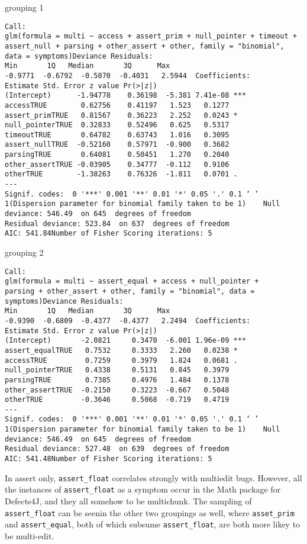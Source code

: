 grouping 1
\begin{lstlisting}
Call:
glm(formula = multi ~ access + assert_prim + null_pointer + timeout +
assert_null + parsing + other_assert + other, family = "binomial",
data = symptoms)Deviance Residuals:
Min       1Q   Median       3Q      Max
-0.9771  -0.6792  -0.5070  -0.4031   2.5944  Coefficients:
Estimate Std. Error z value Pr(>|z|)
(Intercept)      -1.94778    0.36198  -5.381 7.41e-08 ***
accessTRUE        0.62756    0.41197   1.523   0.1277
assert_primTRUE   0.81567    0.36223   2.252   0.0243 *
null_pointerTRUE  0.32833    0.52496   0.625   0.5317
timeoutTRUE       0.64782    0.63743   1.016   0.3095
assert_nullTRUE  -0.52160    0.57971  -0.900   0.3682
parsingTRUE       0.64081    0.50451   1.270   0.2040
other_assertTRUE -0.03905    0.34777  -0.112   0.9106
otherTRUE        -1.38263    0.76326  -1.811   0.0701 .
---
Signif. codes:  0 '***' 0.001 '**' 0.01 '*' 0.05 '.' 0.1 ‘ ’ 1(Dispersion parameter for binomial family taken to be 1)    Null deviance: 546.49  on 645  degrees of freedom
Residual deviance: 523.84  on 637  degrees of freedom
AIC: 541.84Number of Fisher Scoring iterations: 5
\end{lstlisting}

grouping 2
\begin{lstlisting}
Call:
glm(formula = multi ~ assert_equal + access + null_pointer +
parsing + other_assert + other, family = "binomial", data = symptoms)Deviance Residuals:
Min       1Q   Median       3Q      Max
-0.9390  -0.6809  -0.4377  -0.4377   2.2494  Coefficients:
Estimate Std. Error z value Pr(>|z|)
(Intercept)       -2.0821     0.3470  -6.001 1.96e-09 ***
assert_equalTRUE   0.7532     0.3333   2.260   0.0238 *
accessTRUE         0.7259     0.3979   1.824   0.0681 .
null_pointerTRUE   0.4338     0.5131   0.845   0.3979
parsingTRUE        0.7385     0.4976   1.484   0.1378
other_assertTRUE  -0.2150     0.3223  -0.667   0.5048
otherTRUE         -0.3646     0.5068  -0.719   0.4719
---
Signif. codes:  0 '***' 0.001 '**' 0.01 '*' 0.05 '.' 0.1 ‘ ’ 1(Dispersion parameter for binomial family taken to be 1)    Null deviance: 546.49  on 645  degrees of freedom
Residual deviance: 527.48  on 639  degrees of freedom
AIC: 541.48Number of Fisher Scoring iterations: 5
\end{lstlisting}

In assert only, \lstinline{assert_float} correlates strongly with multiedit bugs. However, all the instances of \lstinline{assert_float} as a symptom occur in the Math package for Defects4J, and they all somehow to be multichunk. The sampling of \lstinline{assert_float} can be seenin the other two groupings as well, where \lstinline{asset_prim} and \lstinline{assert_equal}, both of which subsume \lstinline{assert_float}, are both more likey to be multi-edit.  

